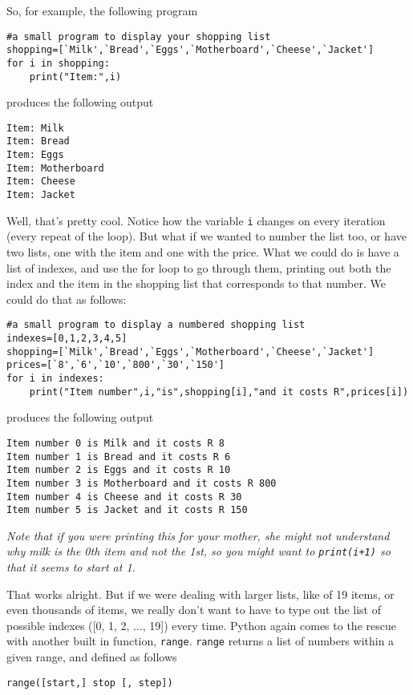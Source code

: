 So, for example, the following program
\begin{lstlisting}
#a small program to display your shopping list
shopping=[`Milk',`Bread',`Eggs',`Motherboard',`Cheese',`Jacket']
for i in shopping:
    print("Item:",i)
\end{lstlisting}

produces the following output
\begin{lstlisting}
Item: Milk
Item: Bread
Item: Eggs
Item: Motherboard
Item: Cheese
Item: Jacket
\end{lstlisting}

Well, that's pretty cool. Notice how the variable \texttt{i} changes on every iteration (every repeat of the loop). But what if we wanted to number the list too, or have two lists, one with the item and one with the price. What we could do is have a list of indexes, and use the for loop to go through them, printing out both the index and the item in the shopping list that corresponds to that number. We could do that as follows: 
\begin{lstlisting}
#a small program to display a numbered shopping list
indexes=[0,1,2,3,4,5]
shopping=[`Milk',`Bread',`Eggs',`Motherboard',`Cheese',`Jacket']
prices=[`8',`6',`10',`800',`30',`150']
for i in indexes:
    print("Item number",i,"is",shopping[i],"and it costs R",prices[i])
\end{lstlisting}   produces the following output  
\begin{lstlisting}
Item number 0 is Milk and it costs R 8
Item number 1 is Bread and it costs R 6
Item number 2 is Eggs and it costs R 10
Item number 3 is Motherboard and it costs R 800
Item number 4 is Cheese and it costs R 30
Item number 5 is Jacket and it costs R 150
\end{lstlisting}

\textit{Note that if you were printing this for your mother, she might not understand why milk is the 0th item and not the 1st, so you might want to \texttt{print(i+1)} so that it seems to start at 1.}

 That works alright. But if we were dealing with larger lists,   like of 19 items, or even thousands of items, we really don't   want to have to type out the list of possible indexes ([0, 1, 2, ...,   19]) every time. Python again comes to the rescue with another built in   function, \texttt{range}.   \texttt{range} returns a list of numbers within a given range, and defined as   follows
\begin{lstlisting}
range([start,] stop [, step])
\end{lstlisting}

